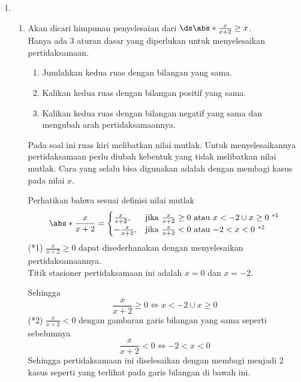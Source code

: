 \begin{enumerate}[leftmargin=*, label={\arabic*}.]
\item
\begin{enumerate}[label={\alph*}.]
    \item Akan dicari himpunan penyelesaian dari 
    $\ds \abs*{\frac{x}{x+2}} \geq x$.\\
    Hanya ada 3 aturan dasar yang diperlukan untuk menyelesaikan pertidaksamaan.
    \begin{enumerate}[label={\arabic*})]
        \item Jumlahkan kedua ruas dengan bilangan yang sama.
        \item Kalikan kedua ruas dengan bilangan positif yang sama.
        \item Kalikan kedua ruas dengan bilangan negatif yang sama dan 
        mengubah arah pertidaksamaannya.
    \end{enumerate}
    Pada soal ini ruas kiri melibatkan nilai mutlak. Untuk menyelesaikannya 
    pertidaksamaan perlu diubah kebentuk yang tidak melibatkan nilai mutlak. 
    Cara yang selalu bisa digunakan adalah dengan membagi kasus pada nilai $x$.
        
    Perhatikan bahwa sesuai definisi nilai mutlak
    \[
    \abs*{\frac{x}{x+2}} = 
    \begin{cases}
        \frac{x}{x+2}, &\text{jika $\frac{x}{x+2} \geq 0$ atau $x < -2 \cup x \geq 0$ $^{*1}$}\\
        -\frac{x}{x+2}, &\text{jika $\frac{x}{x+2} < 0$ atau $-2 < x < 0$ $^{*2}$}
    \end{cases}
    \]
    (*1) $\frac{x}{x+2} \geq 0$ dapat disederhanakan dengan menyelesaikan 
    pertidaksamaannya. \\Titik stasioner pertidaksamaan ini adalah $x= 0$ dan $x=-2$.
    \begin{center}
    \end{center}
    Sehingga
    \[
        \frac{x}{x+2} \geq 0 \iff x < -2 \cup x \geq 0
    \]
    (*2) $\frac{x}{x+2} < 0$ dengan gambaran garis bilangan yang sama seperti sebelumnya
    \[
        \frac{x}{x+2} < 0 \iff -2 < x < 0
    \]
    Sehingga pertidaksamaan ini diselesaikan dengan membagi menjadi 2 kasus seperti 
yang terlihat pada garis bilangan di bawah ini.


\end{enumerate}
\end{enumerate}
